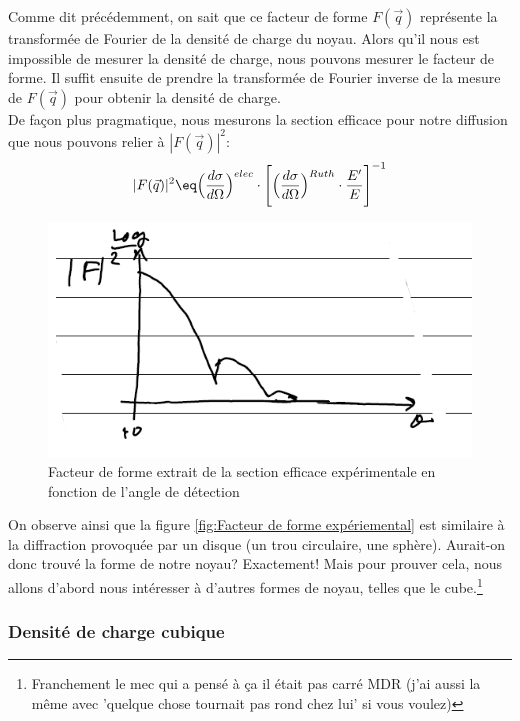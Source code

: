 Comme dit précédemment, on sait que ce facteur de forme $F(\vec{q})$ représente la transformée de Fourier de la densité de charge du noyau. Alors qu'il nous est impossible de mesurer la densité de charge, nous pouvons mesurer le facteur de forme. Il suffit ensuite de prendre la transformée de Fourier inverse de la mesure de $F(\vec{q})$ pour obtenir la densité de charge.\\
De façon plus pragmatique, nous mesurons la section efficace pour notre diffusion que nous pouvons relier à $|F(\vec{q})|^2$:
\begin{equation*}
    |F(\vec{q})|^2 \eq
    \Big( \dfrac{d\sigma}{d\Omega} \Big)^{elec}
    \cdot
    \Bigg[
    \Big( \dfrac{d\sigma}{d\Omega} \Big)^{Ruth}
    \cdot \dfrac{E'}{E}
    \Bigg]^{-1}
\end{equation*}
\begin{figure}[H]
    \centering
    \includegraphics[scale=0.80]{Images4/graphe 2.PNG}
    \caption{Facteur de forme extrait de la section efficace expérimentale en fonction de l'angle de détection}
    \label{fig:Facteur de forme expériemental}
\end{figure}
On observe ainsi que la figure \eqref{fig:Facteur de forme expériemental} est similaire à la diffraction provoquée par un disque (un trou circulaire, une sphère). Aurait-on donc trouvé la forme de notre noyau? Exactement! Mais pour prouver cela, nous allons d'abord nous intéresser à d'autres formes de noyau, telles que le cube.\footnote{Franchement le mec qui a pensé à ça il était pas carré MDR (j'ai aussi la même avec 'quelque chose tournait pas rond chez lui' si vous voulez)}


    \subsubsection{Densité de charge cubique}


